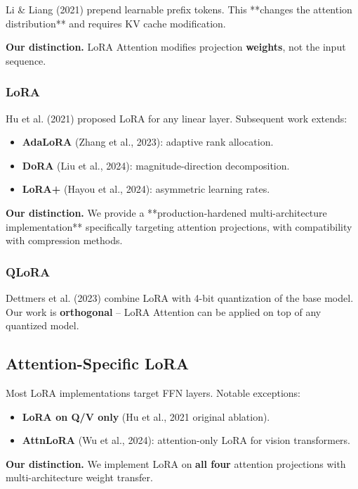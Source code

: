 Li \& Liang (2021) prepend learnable prefix tokens. This **changes the 
attention distribution** and requires KV cache modification.

\textbf{Our distinction.} LoRA Attention modifies projection \textbf{weights}, not 
the input sequence.

\subsubsection{LoRA}

Hu et al. (2021) proposed LoRA for any linear layer. Subsequent work 
extends:
\begin{itemize}
\item \textbf{AdaLoRA} (Zhang et al., 2023): adaptive rank allocation.
\item \textbf{DoRA} (Liu et al., 2024): magnitude-direction decomposition.
\item \textbf{LoRA+} (Hayou et al., 2024): asymmetric learning rates.

\end{itemize}
\textbf{Our distinction.} We provide a **production-hardened multi-architecture 
implementation** specifically targeting attention projections, with 
compatibility with compression methods.

\subsubsection{QLoRA}

Dettmers et al. (2023) combine LoRA with 4-bit quantization of the base 
model. Our work is \textbf{orthogonal} -- LoRA Attention can be applied on top of 
any quantized model.

\subsection{Attention-Specific LoRA}

Most LoRA implementations target FFN layers. Notable exceptions:
\begin{itemize}
\item \textbf{LoRA on Q/V only} (Hu et al., 2021 original ablation).
\item \textbf{AttnLoRA} (Wu et al., 2024): attention-only LoRA for vision transformers.

\end{itemize}
\textbf{Our distinction.} We implement LoRA on \textbf{all four} attention 
projections with multi-architecture weight transfer.

